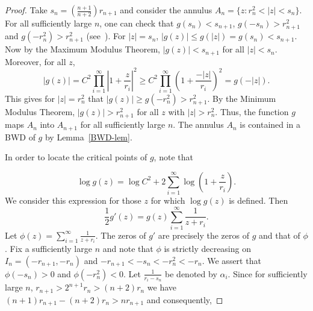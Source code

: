 \documentclass[11pt,a4paper]{article}
\begin{document}
\begin{proof}
	Take $s_n=(\frac{n+1}{n+2})r_{n+1}$ and consider the annulus $A_n=\{z:r_n^2<|z|<s_n\}$. For all sufficiently large $n$, one can check that $g(s_{n})< s_{n+1}$, $g(-s_{n})>r^2_{n+1}$ and $g(-r^2_n)>r^2_{n+1}$ (see~\cite{Baker 1985}). For $|z|=s_n$, $|g(z)|\leq g(|z|)=g(s_n)<s_{n+1}$. Now by the Maximum Modulus Theorem, $|g(z)|<s_{n+1}$  for all $|z|<s_n$. Moreover, for all $z$,
	$$|g(z)|=C^2\prod_{i=1}^{\infty}\left|1+\frac{z}{r_i}\right|^2\geq C^2\prod_{i=1}^{\infty}\left(1+\frac{-|z|}{r_i}\right)^2=g(-|z|).$$ This gives for $|z|=r_n^2$ that $|g(z)|\geq g(-r_n^2)>r_{n+1}^2$. By the Minimum Modulus Theorem, $|g(z)|>r_{n+1}^2$ for all $z$ with $|z|>r_n^2$.
	Thus,  the function $g$ maps $A_n$ into  $A_{n+1}$ for all sufficiently large $n$. The annulus $A_n$ is contained in a BWD of $g$ by Lemma~\ref{BWD-lem}.
\par In order to locate the critical points of $g$, note that

	\begin{equation}\label{Eq11}
		\log g(z)=\log C^2+2\sum_{i=1}^{\infty}\log \left(1+\frac{z}{r_i}\right).
	\end{equation}
	We consider this expression for those $z$ for which  $\log g(z) $ is defined. Then
		$${\frac{1}{2}g'(z)}={g(z)}\sum_{i=1}^{\infty} {\frac{1}{z+r_i}}.$$
		Let $\phi(z)= \sum_{i=1}^{\infty} {\frac{1}{z+r_i}}$.
The zeros of $g'$ are precisely the zeros of $g$ and that of $\phi$. 
Fix a sufficiently large $n$ and note that $\phi$ is strictly decreasing on
	$I_n=(-r_{n+1}, -r_n)$ and $-r_{n+1} < -s_n <-r_n ^2 < -r_n $.
% 
We assert that $\phi(-s_{n})>0$ and $\phi(-r^2_n)<0$. Let   $ \frac{1}{r_{i }-s_{n}}$ be denoted by $\alpha_{i}$. Since for sufficiently large $n$, $r_{n+1}>2^{n+1}r_n>(n+2)r_n$ we have $(n+1)r_{n+1} -(n+2)r_n > n r_{n+1}$ and consequently,
	

\end{proof}
\end{document}
